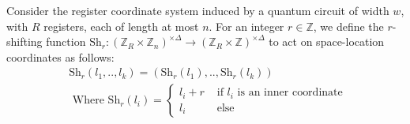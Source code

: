     \begin{definition}
      
Consider the register coordinate system induced by a quantum circuit of width $w$, with $R$ registers, each of length at most $n$. For an integer $r \in \mathbb{Z}$, we define the $r$-shifting function $\text{Sh}_{r} \colon (\mathbb{Z}_{R} \times \mathbb{Z}_{n})^{\times \Delta} \rightarrow (\mathbb{Z}_{R} \times \mathbb{Z})^{\times \Delta}$ to act on space-location coordinates as follows:
  \begin{equation*}
    \begin{split}
      & \text{Sh}_{r}( l_{1}, .., l_{k} ) = ( \text{Sh}_{r}(l_{1}), .., \text{Sh}_{r}(l_{k}) ) \\ 
      & \text{ Where } \text{Sh}_{r}(l_{i}) = 
      \begin{cases}
        l_{i} + r & \text{ if } l_{i} \text{ is an inner coordinate } \\ 
        l_{i}& \text{ else }
      \end{cases}
    \end{split}
  \end{equation*}
\end{definition}

